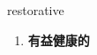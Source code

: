 
\begin{frame}
{\huge restorative}
\begin{center}
\begin{enumerate}\Large
  \item \textbf{有益健康的}
\end{enumerate}
\end{center}
\end{frame}
